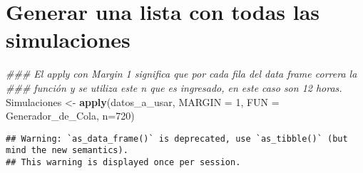 \documentclass[]{article}
\newenvironment{Shaded}{\begin{snugshade}}{\end{snugshade}}
\newcommand{\CommentTok}[1]{\textcolor[rgb]{0.56,0.35,0.01}{\textit{#1}}}
\newcommand{\DataTypeTok}[1]{\textcolor[rgb]{0.13,0.29,0.53}{#1}}
\newcommand{\DecValTok}[1]{\textcolor[rgb]{0.00,0.00,0.81}{#1}}
\newcommand{\KeywordTok}[1]{\textcolor[rgb]{0.13,0.29,0.53}{\textbf{#1}}}
\newcommand{\NormalTok}[1]{#1}
\newcommand{\OperatorTok}[1]{\textcolor[rgb]{0.81,0.36,0.00}{\textbf{#1}}}
\newcommand{\StringTok}[1]{\textcolor[rgb]{0.31,0.60,0.02}{#1}}
\begin{document}
\hypertarget{generar-una-lista-con-todas-las-simulaciones}{%
\section{Generar una lista con todas las
simulaciones}\label{generar-una-lista-con-todas-las-simulaciones}}

\begin{Shaded}
\begin{Highlighting}[]
\CommentTok{### El apply con Margin 1 significa que por cada fila del data frame correra la }
\CommentTok{###   función y se utiliza este n que es ingresado, en este caso son 12 horas.}
\NormalTok{Simulaciones <-}\StringTok{ }\KeywordTok{apply}\NormalTok{(datos_a_usar, }\DataTypeTok{MARGIN =} \DecValTok{1}\NormalTok{, }\DataTypeTok{FUN =}\NormalTok{ Generador_de_Cola, }\DataTypeTok{n=}\DecValTok{720}\NormalTok{)}
\end{Highlighting}
\end{Shaded}

\begin{verbatim}
## Warning: `as_data_frame()` is deprecated, use `as_tibble()` (but mind the new semantics).
## This warning is displayed once per session.
\end{verbatim}

\begin{Shaded}
\end{Shaded}
\end{document}
